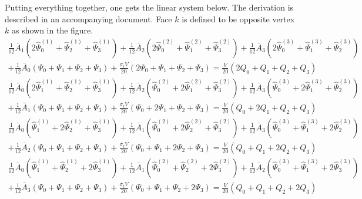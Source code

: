 \documentclass[12pt,letterpaper]{article}
\begin{document}
Putting everything together, one gets the linear system below.
The derivation is described in an accompanying document.
Face $k$ is defined to be opposite vertex $k$ as shown in the figure.
\begin{align*}
\frac{1}{12} \bar{A}_1 \left( 2\hat{\Psi}^{(1)}_0 + \hat{\Psi}^{(1)}_2 + \hat{\Psi}^{(1)}_3 \right)
+ \frac{1}{12} \bar{A}_2 \left( 2\hat{\Psi}^{(2)}_0 + \hat{\Psi}^{(2)}_1 + \hat{\Psi}^{(2)}_3 \right)
+ \frac{1}{12} \bar{A}_3 \left( 2\hat{\Psi}^{(3)}_0 + \hat{\Psi}^{(3)}_1 + \hat{\Psi}^{(3)}_2 \right) \\
+ \frac{1}{12} \bar{A}_0 \left( \Psi_0 + \Psi_1 + \Psi_2 + \Psi_3 \right)
+ \frac{\sigma_t V}{20} \left( 2\Psi_0 + \Psi_1 + \Psi_2 + \Psi_3 \right)
= \frac{V}{20} \left( 2Q_0 + Q_1 + Q_2 + Q_3 \right)
\end{align*}
\begin{align*}
\frac{1}{12} \bar{A}_0 \left( 2\hat{\Psi}^{(1)}_1 + \hat{\Psi}^{(1)}_2 + \hat{\Psi}^{(1)}_3 \right)
+ \frac{1}{12} \bar{A}_2 \left( \hat{\Psi}^{(2)}_0 + 2\hat{\Psi}^{(2)}_1 + \hat{\Psi}^{(2)}_3 \right)
+ \frac{1}{12} \bar{A}_3 \left( \hat{\Psi}^{(3)}_0 + 2\hat{\Psi}^{(3)}_1 + \hat{\Psi}^{(3)}_2 \right) \\
+ \frac{1}{12} \bar{A}_1 \left( \Psi_0 + \Psi_1 + \Psi_2 + \Psi_3 \right)
+ \frac{\sigma_t V}{20} \left( \Psi_0 + 2\Psi_1 + \Psi_2 + \Psi_3 \right)
= \frac{V}{20} \left( Q_0 + 2Q_1 + Q_2 + Q_3 \right)
\end{align*}
\begin{align*}
\frac{1}{12} \bar{A}_0 \left( \hat{\Psi}^{(1)}_1 + 2\hat{\Psi}^{(1)}_2 + \hat{\Psi}^{(1)}_3 \right)
+ \frac{1}{12} \bar{A}_1 \left( \hat{\Psi}^{(2)}_0 + 2\hat{\Psi}^{(2)}_2 + \hat{\Psi}^{(2)}_3 \right)
+ \frac{1}{12} \bar{A}_3 \left( \hat{\Psi}^{(3)}_0 + \hat{\Psi}^{(3)}_1 + 2\hat{\Psi}^{(3)}_2 \right) \\
+ \frac{1}{12} \bar{A}_2 \left( \Psi_0 + \Psi_1 + \Psi_2 + \Psi_3 \right)
+ \frac{\sigma_t V}{20} \left( \Psi_0 + \Psi_1 + 2\Psi_2 + \Psi_3 \right)
= \frac{V}{20} \left( Q_0 + Q_1 + 2Q_2 + Q_3 \right)
\end{align*}
\begin{align*}
\frac{1}{12} \bar{A}_0 \left( \hat{\Psi}^{(1)}_1 + \hat{\Psi}^{(1)}_2 + 2\hat{\Psi}^{(1)}_3 \right)
+ \frac{1}{12} \bar{A}_1 \left( \hat{\Psi}^{(2)}_0 + \hat{\Psi}^{(2)}_2 + 2\hat{\Psi}^{(2)}_3 \right)
+ \frac{1}{12} \bar{A}_2 \left( \hat{\Psi}^{(3)}_0 + \hat{\Psi}^{(3)}_1 + 2\hat{\Psi}^{(3)}_3 \right) \\
+ \frac{1}{12} \bar{A}_3 \left( \Psi_0 + \Psi_1 + \Psi_2 + \Psi_3 \right)
+ \frac{\sigma_t V}{20} \left( \Psi_0 + \Psi_1 + \Psi_2 + 2\Psi_3 \right)
= \frac{V}{20} \left( Q_0 + Q_1 + Q_2 + 2Q_3 \right)
\end{align*}
\end{document}
